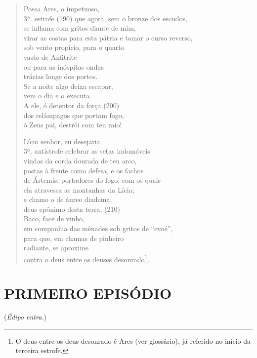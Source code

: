 \begin{verse}
Possa Ares, o impetuoso,\\ 3ª. estrofe (190)
que agora, sem o bronze dos escudos,\\
se inflama com gritos diante de mim,\\
virar as costas para esta pátria e tomar o curso reverso,\\
sob vento propício, para o quarto\\
vasto de Anfitrite\\
ou para as inóspitas ondas\\
trácias longe dos portos.\\
Se a noite algo deixa escapar,\\
vem o dia e o executa.\\
A ele, ó detentor da força (200)\\
dos relâmpagos que portam fogo,\\
ó Zeus pai, destrói com teu raio!

Lício senhor, eu desejaria\\ 3ª. antístrofe
celebrar as setas indomáveis\\
vindas da corda dourada de teu arco,\\
postas à frente como defesa, e os fachos\\
de Ártemis, portadores do fogo, com os quais\\
ela atravessa as montanhas da Lícia;\\
e chamo o de áureo diadema,\\
deus epônimo desta terra, (210)\\
Baco, face de vinho,\\
em companhia das mênades sob gritos de ``evoé'',\\
para que, em chamas de pinheiro\\
radiante, se aproxime\\
contra o deus entre os deuses desonrado\footnote{O deus entre os deus desonrado é Ares (ver glossário), já referido no início da terceira estrofe.}.
\end{verse}

\section{PRIMEIRO EPISÓDIO}

(\emph{Édipo entra.})

